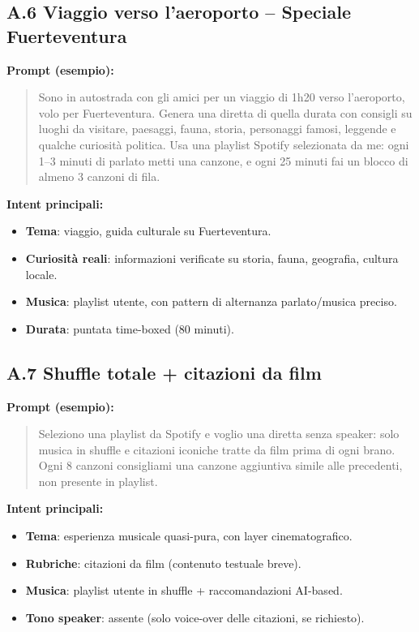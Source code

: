 \documentclass[11pt,a4paper]{article}
\begin{document}
\subsection*{A.6 Viaggio verso l’aeroporto – Speciale Fuerteventura}

\textbf{Prompt (esempio):}
\begin{quote}
Sono in autostrada con gli amici per un viaggio di 1h20 verso l’aeroporto, volo per Fuerteventura. Genera una diretta di quella durata con consigli su luoghi da visitare, paesaggi, fauna, storia, personaggi famosi, leggende e qualche curiosità politica. Usa una playlist Spotify selezionata da me: ogni 1--3 minuti di parlato metti una canzone, e ogni 25 minuti fai un blocco di almeno 3 canzoni di fila.
\end{quote}

\textbf{Intent principali:}
\begin{itemize}[leftmargin=*]
    \item \textbf{Tema}: viaggio, guida culturale su Fuerteventura.
    \item \textbf{Curiosità reali}: informazioni verificate su storia, fauna, geografia, cultura locale.
    \item \textbf{Musica}: playlist utente, con pattern di alternanza parlato/musica preciso.
    \item \textbf{Durata}: puntata time-boxed (80 minuti).
\end{itemize}

\subsection*{A.7 Shuffle totale + citazioni da film}

\textbf{Prompt (esempio):}
\begin{quote}
Seleziono una playlist da Spotify e voglio una diretta senza speaker: solo musica in shuffle e citazioni iconiche tratte da film prima di ogni brano. Ogni 8 canzoni consigliami una canzone aggiuntiva simile alle precedenti, non presente in playlist.
\end{quote}

\textbf{Intent principali:}
\begin{itemize}[leftmargin=*]
    \item \textbf{Tema}: esperienza musicale quasi-pura, con layer cinematografico.
    \item \textbf{Rubriche}: citazioni da film (contenuto testuale breve).
    \item \textbf{Musica}: playlist utente in shuffle + raccomandazioni AI-based.
    \item \textbf{Tono speaker}: assente (solo voice-over delle citazioni, se richiesto).
\end{itemize}
\end{document}
